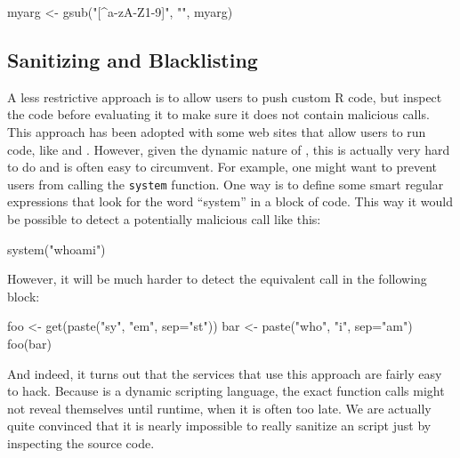 \documentclass[article]{jss}
\begin{document}
\begin{CodeChunk}
\begin{CodeInput}
myarg <- gsub("[^a-zA-Z1-9]", "", myarg)
\end{CodeInput}
\end{CodeChunk}


\subsection{Sanitizing and Blacklisting}

A less restrictive approach is to allow users to push custom R code, but inspect
the code before evaluating it to make sure it does not contain malicious calls.
This approach has been adopted with some web sites that allow users to run
 code, like \cite{banfield1999rweb} and \cite{cloudstat}. However,
given the dynamic nature of , this is actually very hard to do and
is often easy to circumvent. For example, one might want to prevent users from
calling the \texttt{system} function. One way is to define some smart regular
expressions that look for the word ``system'' in a block of code. This way
it would be possible to detect a potentially malicious call like this:

\begin{CodeChunk}
\begin{CodeInput}
system("whoami")
\end{CodeInput}
\end{CodeChunk}

However, it will be much harder to detect the equivalent call in the following
block:

\begin{CodeChunk}
\begin{CodeInput}
foo <- get(paste("sy", "em", sep="st"))
bar <- paste("who", "i", sep="am")
foo(bar)
\end{CodeInput}
\end{CodeChunk}

And indeed, it turns out that the services that use this approach are fairly
easy to hack. Because  is a dynamic scripting language, the exact
function calls might not reveal themselves until runtime, when it is often too
late. We are actually quite convinced that it is nearly impossible to really
sanitize an  script just by inspecting the source code.
\end{document}

